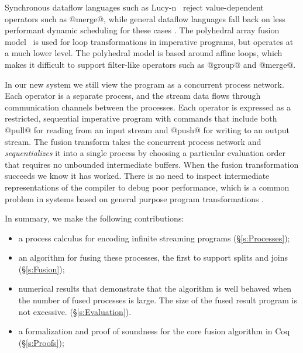 
Synchronous dataflow languages such as Lucy-n~\cite{mandel2010lucy} reject value-dependent operators such as @merge@, while general dataflow languages fall back on less performant dynamic scheduling for these cases \cite{bouakaz2013real}. The polyhedral array fusion model~\cite{feautrier2011polyhedron} is used for loop transformations in imperative programs, but operates at a much lower level. The polyhedral model is based around affine loops, which makes it difficult to support filter-like operators such as @group@ and @merge@.

In our new system we still view the program as a concurrent process network. Each operator is a separate process, and the stream data flows through communication channels between the processes. Each operator is expressed as a restricted, sequential imperative program with commands that include both @pull@ for reading from an input stream and @push@ for writing to an output stream. The fusion transform takes the concurrent process network and \emph{sequentializes} it into a single process by choosing a particular evaluation order that requires no unbounded intermediate buffers. When the fusion transformation succeeds we know it has worked. There is no need to inspect intermediate representations of the compiler to debug poor performance, which is a common problem in systems based on general purpose program transformations \cite{lippmeier2012:guiding}.

In summary, we make the following contributions:
\begin{itemize}
\item a process calculus for encoding infinite streaming programs (\S\ref{s:Processes});
\item an algorithm for fusing these processes, the first to support splits and joins (\S\ref{s:Fusion});
\item numerical results that demonstrate that the algorithm is well behaved when the number of fused processes is large. The size of the fused result program is not excessive. (\S\ref{s:Evaluation}).
\item a formalization and proof of soundness for the core fusion algorithm in Coq (\S\ref{s:Proofs});
\end{itemize}

